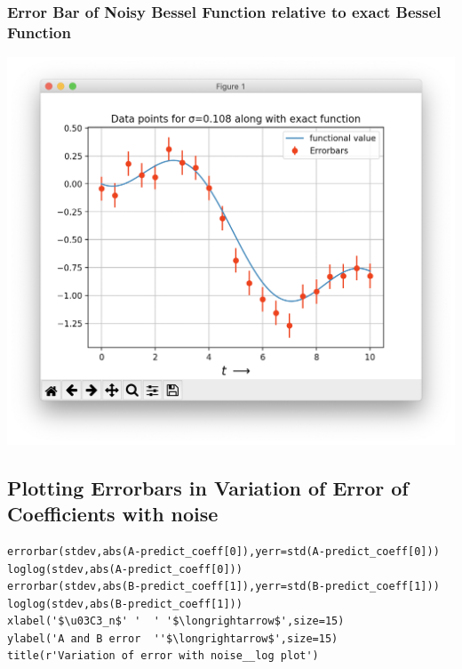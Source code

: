 \documentclass[10pt,english, openany]{book}
\begin{document}
\subsubsection{Error Bar of Noisy Bessel Function relative to exact Bessel Function}
{\centering\includegraphics[scale=0.4]{scr4.png}}


\subsection{Plotting Errorbars in Variation of Error of Coefficients with noise}
\begin{verbatim}
errorbar(stdev,abs(A-predict_coeff[0]),yerr=std(A-predict_coeff[0]))
loglog(stdev,abs(A-predict_coeff[0]))
errorbar(stdev,abs(B-predict_coeff[1]),yerr=std(B-predict_coeff[1]))
loglog(stdev,abs(B-predict_coeff[1]))
xlabel('$\u03C3_n$' '  ' '$\longrightarrow$',size=15)
ylabel('A and B error  ''$\longrightarrow$',size=15)
title(r'Variation of error with noise__log plot')
\end{verbatim}
\end{document}
